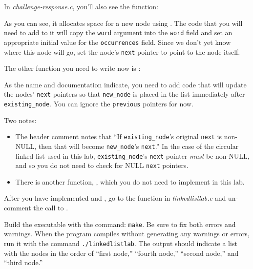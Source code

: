 In \textit{challenge-response.c}, you'll also see the  function:



As you can see, it allocates space for a new node using .
The code that you will need to add to it will copy the \lstinline{word} argument into the \lstinline{word} field and set an appropriate initial value for the \lstinline{occurrences} field.
Since we don't yet know where this node will go, set the node's \lstinline{next} pointer to point to the node itself.

The other function you need to write now is :



As the name and documentation indicate, you need to add code that will update the nodes' \lstinline{next} pointers so that \lstinline{new_node} is placed in the list immediately after \lstinline{existing_node}.
You can ignore the \lstinline{previous} pointers for now.

Two notes:
\begin{itemize}
    \item The header comment notes that ``If \lstinline{existing_node}'s original \lstinline{next} is non-NULL, then that will become \lstinline{new_node}'s \lstinline{next}.''
            In the case of the circular linked list used in this lab, \lstinline{existing_node}'s \lstinline{next} pointer \textit{must} be non-NULL, and so you do not need to check for NULL \lstinline{next} pointers.
    \item There is another function, , which you do not need to implement in this lab.
\end{itemize}

After you have implemented  and , go to the  function in \textit{linkedlistlab.c} and un-comment the call to .



Build the executable with the command: \texttt{make}.
Be sure to fix both errors and warnings.
When the program compiles without generating any warnings or errors, run it with the command \texttt{./linkedlistlab}.
The output should indicate a list with the nodes in the order of ``first node,'' ``fourth node,'' ``second node,'' and ``third node.''

